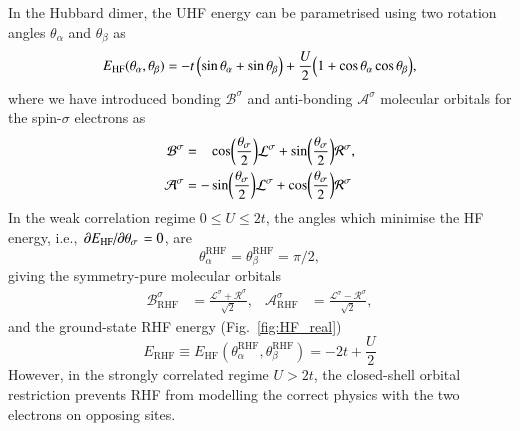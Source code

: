 \documentclass[aps,prb,reprint,noshowkeys,linenumbers,superscriptaddress]{revtex4-1}
\newcommand{\latin}[1]{#1}
\newcommand{\ie}{\latin{i.e.}}
\newcommand{\ta}{\theta_{\alpha}}
\newcommand{\tb}{\theta_{\beta}}
\newcommand{\Lsi}{\mathcal{L}^{\sigma}}
\newcommand{\Rsi}{\mathcal{R}^{\sigma}}
\begin{document}
In the Hubbard dimer, the UHF energy can be parametrised using two rotation angles $\ta$ and $\tb$ as
\begin{equation}
E_\text{HF}(\ta, \tb) = -t\, \qty( \sin \ta + \sin \tb ) + \frac{U}{2} \qty( 1 + \cos \ta \cos \tb ),
\end{equation}
where we have introduced bonding $\mathcal{B}^{\sigma}$ and anti-bonding $\mathcal{A}^{\sigma}$ molecular orbitals for 
the spin-$\sigma$ electrons as
\begin{subequations}
\begin{align}
    \mathcal{B}^{\sigma} & = \hphantom{-} \cos(\frac{\theta_\sigma}{2}) \Lsi + \sin(\frac{\theta_\sigma}{2}) \Rsi,
	\\
	\mathcal{A}^{\sigma} & = - \sin(\frac{\theta_\sigma}{2}) \Lsi + \cos(\frac{\theta_\sigma}{2}) \Rsi
\end{align}
\end{subequations}
In the weak correlation regime $0 \le U \le 2t$, the angles which minimise the HF energy, 
\ie, $\pdv*{E_\text{HF}}{\theta_\sigma} = 0$, are 
\begin{equation}
	\ta^\text{RHF} = \tb^\text{RHF} = \pi/2,
\end{equation}
giving the symmetry-pure molecular orbitals
\begin{align}
	\mathcal{B}_\text{RHF}^{\sigma} & = \frac{\Lsi + \Rsi}{\sqrt{2}},
	&
	\mathcal{A}_\text{RHF}^{\sigma} & = \frac{\Lsi - \Rsi}{\sqrt{2}},
\end{align}
and the ground-state RHF energy (Fig.~\ref{fig:HF_real})
\begin{equation}
	E_\text{RHF} \equiv E_\text{HF}(\ta^\text{RHF}, \tb^\text{RHF}) = -2t + \frac{U}{2}
\end{equation}
However, in the strongly correlated regime $U>2t$, the closed-shell orbital restriction prevents RHF from 
modelling the correct physics with the two electrons on opposing sites.
\end{document}
